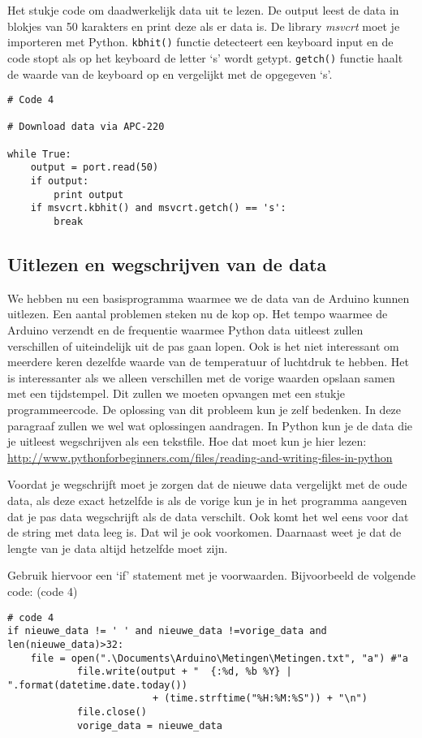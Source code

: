 Het stukje code om daadwerkelijk data uit te lezen. De output leest de
data in blokjes van 50 karakters en print deze als er data is. De
library \emph{msvcrt} moet je importeren met Python. \verb|kbhit()|
functie detecteert een keyboard input en de code stopt als op het keyboard de
letter `s' wordt getypt. \verb|getch()| functie haalt de waarde van de keyboard 
 op en vergelijkt met de opgegeven `s'.

\begin{verbatim}
# Code 4

# Download data via APC-220  
 
while True:
    output = port.read(50)
    if output:
        print output
    if msvcrt.kbhit() and msvcrt.getch() == 's':
        break
\end{verbatim}

\subsection{Uitlezen en wegschrijven van de data}

We hebben nu een basisprogramma waarmee we de data van de Arduino kunnen
uitlezen. Een aantal problemen steken nu de kop op. Het tempo waarmee de
Arduino verzendt en de frequentie waarmee Python data uitleest zullen
verschillen of uiteindelijk uit de pas gaan lopen. Ook is het niet
interessant om meerdere keren dezelfde waarde van de temperatuur of
luchtdruk te hebben. Het is interessanter als we alleen verschillen met
de vorige waarden opslaan samen met een tijdstempel. Dit zullen we moeten opvangen met een stukje
programmeercode. De oplossing van dit probleem kun je zelf bedenken.
In deze paragraaf zullen we wel wat oplossingen aandragen.
In Python kun je de data die je uitleest wegschrijven als een tekstfile.
Hoe dat moet kun je hier lezen:
\url{http://www.pythonforbeginners.com/files/reading-and-writing-files-in-python}

Voordat je wegschrijft moet je zorgen dat de nieuwe data vergelijkt met de oude data, als deze exact hetzelfde is
als de vorige kun je in het programma aangeven dat je pas data wegschrijft als de data verschilt.
Ook komt het wel eens voor dat de string met data leeg is. Dat wil je ook voorkomen.
Daarnaast weet je dat de lengte van je data altijd hetzelfde moet zijn.

Gebruik hiervoor een `if' statement met je voorwaarden. Bijvoorbeeld de volgende code:
(code 4)

\begin{verbatim}
# code 4
if nieuwe_data != ' ' and nieuwe_data !=vorige_data and len(nieuwe_data)>32:
    file = open(".\Documents\Arduino\Metingen\Metingen.txt", "a") #"a
            file.write(output + "  {:%d, %b %Y} | ".format(datetime.date.today())
                         + (time.strftime("%H:%M:%S")) + "\n")
            file.close()
            vorige_data = nieuwe_data
\end{verbatim}

